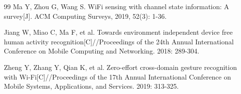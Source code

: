 \begin{thebibliography}{99}
Ma Y, Zhou G, Wang S. WiFi sensing with channel state information: A survey[J]. ACM Computing Surveys, 2019, 52(3): 1-36.

Jiang W, Miao C, Ma F, et al. Towards environment independent device free human activity recognition[C]//Proceedings of the 24th Annual International Conference on Mobile Computing and Networking. 2018: 289-304.

Zheng Y, Zhang Y, Qian K, et al. Zero-effort cross-domain gesture recognition with Wi-Fi[C]//Proceedings of the 17th Annual International Conference on Mobile Systems, Applications, and Services. 2019: 313-325.
\end{thebibliography}
